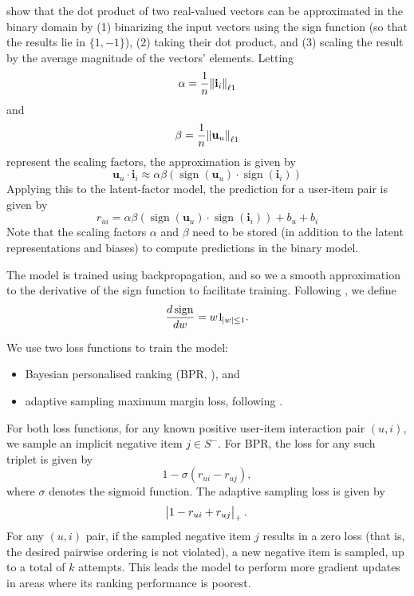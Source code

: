 \documentclass[sigchi]{acmart}
\newcommand\symUserInteractionSet{S}
\DeclareMathOperator{\sign}{sign}
\renewcommand\vec{\mathbf}
\begin{document}
\citet{rastegari2016xnor} show that the dot product of two real-valued vectors can be approximated in the binary domain by (1) binarizing the input vectors using the sign function (so that the results lie in $\{1, -1\}$), (2) taking their dot product, and (3) scaling the result by the average magnitude of the vectors' elements. Letting
\begin{equation}
\alpha = \frac{1}{n}\norm{\vec{i}_{i}}_{\ell1}
\end{equation}
and
\begin{equation}
\beta = \frac{1}{n}\norm{\vec{u}_{u}}_{\ell1}
\end{equation}
represent the scaling factors, the approximation is given by
\newcommand\binaryApproximation{ \alpha \beta\left(\sign(\vec{u}_u) \cdot \sign(\vec{i}_i)\right)}
\begin{equation}
\vec{u}_u \cdot \vec{i}_i \approx \binaryApproximation
\end{equation}
Applying this to the latent-factor model, the prediction for a user-item pair is given by
\begin{equation}
r_{ui} = \binaryApproximation + b_u + b_i
\end{equation}
Note that the scaling factors $\alpha$ and $\beta$ need to be stored (in addition to the latent representations and biases) to compute predictions in the binary model.

The model is trained using backpropagation, and so we a smooth approximation to the derivative of the sign function to facilitate training. Following \citet{courbariaux2016binarized}, we define
\begin{equation}
\frac{d\sign}{dw} = w1_{\abs{w} \leq 1}.
\end{equation}

We use two loss functions to train the model:
\begin{itemize}
\item Bayesian personalised ranking (BPR, \citet{rendle2009bpr}), and
\item adaptive sampling maximum margin loss, following \citet{weston2011wsabie}.
\end{itemize}
For both loss functions, for any known positive user-item interaction pair $(u, i)$, we sample an implicit negative item $j \in \symUserInteractionSet^-$. For BPR, the loss for any such triplet is given by
\begin{equation}
1 - \sigma\left(r_{ui} - r_{uj}\right),
\end{equation}
where $\sigma$ denotes the sigmoid function.
The adaptive sampling loss is given by
\begin{equation}
\abs{1 - r_{ui} + r_{uj}}_{+}.
\end{equation}
For any $(u, i)$ pair, if the sampled negative item $j$ results in a zero loss (that is, the desired pairwise ordering is not violated), a new negative item is sampled, up to a total of $k$ attempts. This leads the model to perform more gradient updates in areas where its ranking performance is poorest.
\end{document}
